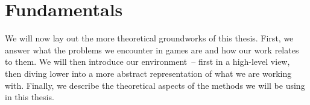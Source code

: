 \section{Fundamentals}

We will now lay out the more theoretical groundworks of this thesis.
First, we answer what the problems we encounter in games are and how
our work relates to them. We will then introduce our environment~--
first in a high-level view, then diving lower into a more abstract
representation of what we are working with. Finally, we describe the
theoretical aspects of the methods we will be using in this thesis.






